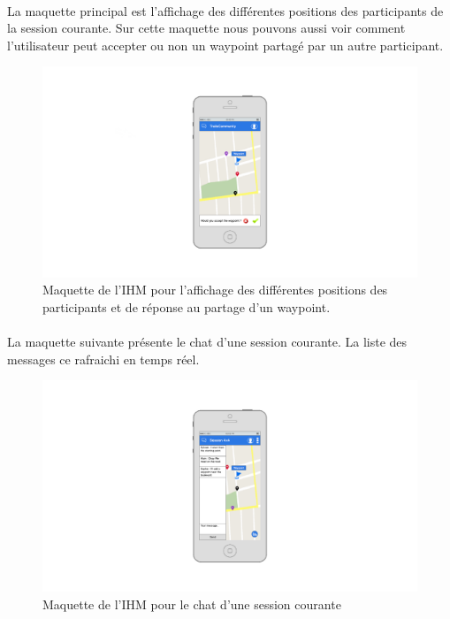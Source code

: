 \documentclass[titlepage, 12pt]{report}
\begin{document}
\paragraph{}La maquette principal est l'affichage des différentes positions des participants de la session courante. Sur cette maquette nous pouvons aussi voir comment l'utilisateur peut accepter ou non un waypoint partagé par un autre participant.

\begin{figure}[!h]
	\caption{Maquette de l'IHM pour l'affichage des différentes positions des participants et de réponse au partage d'un waypoint.}
	\label{session_view}
	\centering
	\includegraphics[scale=0.2]{images/mockups/session_marker.png}
\end{figure}

\paragraph{}La maquette suivante présente le chat d'une session courante. La liste des messages ce rafraichi en temps réel.

\begin{figure}[!h]
	\caption{Maquette de l'IHM pour le chat d'une session courante}
	\label{chat_view}
	\centering
	\includegraphics[scale=0.2]{images/mockups/chat.png}
\end{figure}
\end{document}
